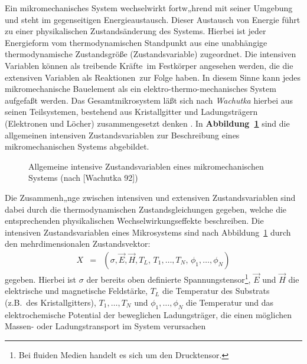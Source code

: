 Ein mikromechanisches System wechselwirkt fortw„hrend mit seiner
Umgebung und steht im gegenseitigen Energieaustausch.  Dieser Austausch
von Energie führt zu einer physikalischen Zustandsänderung des Systems.
Hierbei ist jeder Energieform vom thermodynamischen Standpunkt aus
eine unabhängige thermodynamische Zustandsgröße (Zustandsvariable)
zugeordnet.  Die intensiven Variablen können als
\glqq treibende Kräfte\grqq \, im
Festkörper angesehen werden, die die extensiven Variablen als
\glqq Reaktionen\grqq \, zur Folge haben.  In diesem Sinne kann jedes
mikromechanische Bauelement als ein elektro-thermo-mechanisches System
aufgefaßt werden. Das Gesamtmikrosystem läßt sich nach {\sl Wachutka}
hierbei aus seinen Teilsystemen, bestehend aus Kristallgitter und
Ladungsträgern (Elektronen und Löcher) zusammengesetzt denken \cite{Wac92}.
In {\bf Abbildung~\ref{abbwachutka}}
sind die allgemeinen intensiven Zustandsvariablen zur Beschreibung
eines mikromechanischen Systems abgebildet.
\begin{figure}[htb]
\begin{center}

\setabbze
\end{center}
\caption{\label{abbwachutka}
 Allgemeine intensive Zustandsvariablen eines mikromechanischen
 Systems (nach [Wachutka 92])}
\end{figure}
Die Zusammenh„nge zwischen intensiven und extensiven Zustandsvariablen
sind dabei durch die thermodynamischen Zustandsgleichungen gegeben, welche
die entsprechenden physikalischen Wechselwirkungseffekte beschreiben. Die
intensiven Zustandsvariablen eines Mikrosystems sind nach
Abbildung~\ref{abbwachutka} durch den mehrdimensionalen Zustandsvektor:
%
\begin{eqnarray}
 X & = & \left ( \sigma, \vec{E}, \vec{H}, T_{L}, \, T_{1}, \ldots ,
         T_{N}, \, \phi_{1}, \ldots , \phi_{N} \right )
\end{eqnarray}
%
gegeben.  Hierbei ist $\sigma$ der bereits oben definierte
Spannungstensor\footnote{Bei fluiden Medien handelt es sich um den
Drucktensor.},
$\vec{E}$ und $\vec{H}$ die elektrische und magnetische Feldstärke,
$T_{L}$ die Temperatur des Substrats (z.B.\ des Kristallgitters),
$T_{1}, \ldots , T_{N}$  und $ \phi_{1}, \ldots , \phi_{N} $ die
Temperatur und das elektrochemische Potential der beweglichen Ladungsträger,
die einen möglichen Massen- oder Ladungstransport im System verursachen
